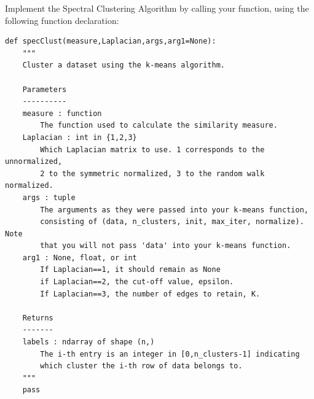 \begin{problem}
Implement the Spectral Clustering Algorithm by calling your  function, using the following function declaration:
\begin{lstlisting}
def specClust(measure,Laplacian,args,arg1=None):
    """
    Cluster a dataset using the k-means algorithm.

    Parameters
    ----------
    measure : function
        The function used to calculate the similarity measure.
    Laplacian : int in {1,2,3}
        Which Laplacian matrix to use. 1 corresponds to the unnormalized,
        2 to the symmetric normalized, 3 to the random walk normalized.
    args : tuple
        The arguments as they were passed into your k-means function,
        consisting of (data, n_clusters, init, max_iter, normalize). Note
        that you will not pass 'data' into your k-means function.
    arg1 : None, float, or int
        If Laplacian==1, it should remain as None
        if Laplacian==2, the cut-off value, epsilon.
        If Laplacian==3, the number of edges to retain, K.

    Returns
    -------
    labels : ndarray of shape (n,)
        The i-th entry is an integer in [0,n_clusters-1] indicating
        which cluster the i-th row of data belongs to.
    """
    pass
\end{lstlisting}
\end{problem}
